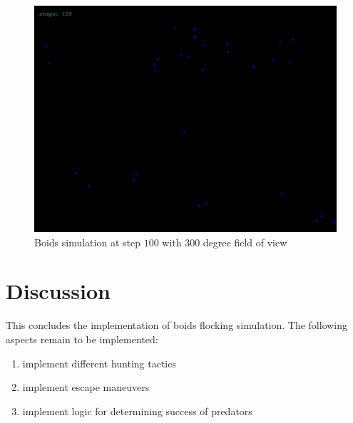 \documentclass[9pt]{pnas-new}
\begin{document}
\begin{figure}[h]
	\centering
	\includegraphics[width=0.8\linewidth]{boids_step_100_low_fov.jpg}
	\caption{Boids simulation at step $100$ with 300 degree field of view}
	\label{300deg}
\end{figure}

\newpage

\section*{Discussion}
This concludes the implementation of boids flocking simulation.
The following aspects remain to be implemented:
\begin{enumerate}
	\item implement different hunting tactics
	\item implement escape maneuvers
	\item implement logic for determining success of predators
\end{enumerate}


\showacknow %


\begin{multicols}{2}
	\section*{\bibname}
	
\end{multicols}
\end{document}
